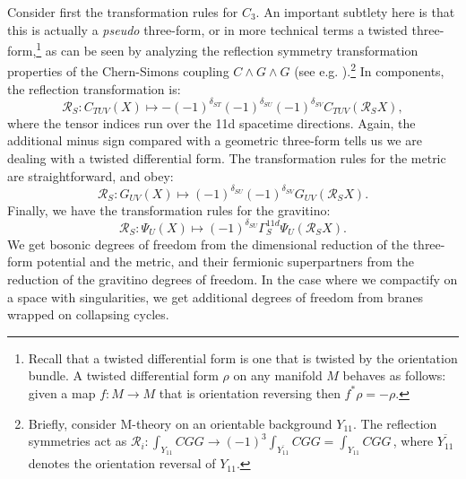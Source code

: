 \documentclass[12pt]{article}%
\numberwithin{equation}{section}
\renewcommand{\(}{\left(}
\renewcommand{\)}{\right)}
\renewcommand{\[}{\left[}
\renewcommand{\]}{\right]}
\begin{document}
Consider first the transformation rules for $C_3$. An important subtlety here is that this is actually a \textit{pseudo} three-form, or in more technical terms a twisted three-form,\footnote{Recall that a twisted differential form is one that is twisted by the orientation bundle. A twisted differential form $\rho$ on any manifold $M$ behaves as follows: given a map $f : M \rightarrow M$ that is orientation reversing then $f^* \rho = - \rho$.} as can be seen by analyzing
the reflection symmetry transformation properties of the Chern-Simons coupling $C \wedge G \wedge G$ (see e.g. \cite{Cremmer:1978km}).\footnote{Briefly, consider M-theory on an orientable background $Y_{11}$. The
reflection symmetries act as $\mathcal{R}_i:\int_{Y_{11}}CGG\rightarrow (-1)^3\int_{\overline{Y_{11}}} CGG=\int_{Y_{11}}CGG\,$, where $\overline{Y_{11}}$ denotes the orientation reversal of $Y_{11}$.} In components, the reflection transformation is:
\begin{equation} \label{eqn:REFLECT}
\mathcal{R}_S : C_{TUV}(X) \mapsto -(-1)^{\delta_{ST}}(-1)^{\delta_{SU}}(-1)^{\delta_{SV}} C_{TUV} (\mathcal{R}_S X),
\end{equation}
where the tensor indices run over the 11d spacetime directions. Again, the additional minus
sign compared with a geometric three-form tells us we are dealing with a twisted differential form.
The transformation rules for the metric are straightforward, and obey:
\begin{equation}
\mathcal{R}_S: G_{UV}(X) \mapsto  (-1)^{\delta_{SU}} (-1)^{\delta_{SV}} G_{UV}(\mathcal{R}_S X).
\end{equation}
Finally, we have the transformation rules for the gravitino:
\begin{equation}
\mathcal{R}_S: \Psi_{U}(X) \mapsto  (-1)^{\delta_{SU}} \Gamma^{11d}_{S} \Psi_{U}(\mathcal{R}_S X).
\end{equation}
We get bosonic degrees of freedom from the dimensional reduction of the three-form potential and the metric, and
their fermionic superpartners from the reduction of the gravitino degrees of freedom. In the case where we compactify on a space with singularities, we get additional degrees of freedom from branes wrapped on collapsing cycles.
\end{document}

